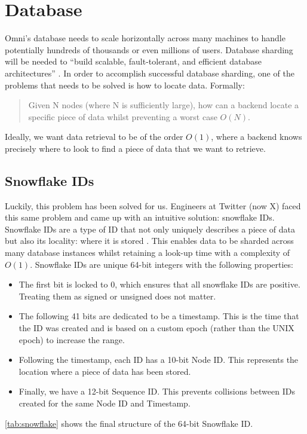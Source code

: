 \section{Database}
\label{sec:design-system-database}
Omni's database needs to scale horizontally across many machines to handle potentially hundreds of thousands or even millions of users. Database sharding will be needed to ``build scalable, fault-tolerant, and efficient database architectures'' \citep{shethiya2025load}.
In order to accomplish successful database sharding, one of the problems that needs to be solved is how to locate data. Formally:
\begin{quotation} %
Given N nodes (where N is sufficiently large), how can a backend locate a specific piece of data whilst preventing a worst case $O(N)$.
\end{quotation}
Ideally, we want data retrieval to be of the order $O(1)$, where a backend knows precisely where to look to find a piece of data that we want to retrieve.

\subsection{Snowflake IDs} 
\label{sec:design-system-database-snowflake}
Luckily, this problem has been solved for us. Engineers at Twitter (now X) faced this same problem and came up with an intuitive solution: snowflake IDs. Snowflake IDs are a type of ID that not only uniquely describes a piece of data but also its locality: where it is stored \citep{2010snowflake}. This enables data to be sharded across many database instances whilst retaining a look-up time with a complexity of $O(1)$.
Snowflake IDs are unique 64-bit integers with the following properties:
\begin{itemize}
    \item The first bit is locked to 0, which ensures that all snowflake IDs are positive. Treating them as signed or unsigned does not matter.
    \item The following 41 bits are dedicated to be a timestamp. This is the time that the ID was created and is based on a custom epoch (rather than the UNIX epoch) to increase the range.
    \item Following the timestamp, each ID has a 10-bit Node ID. This represents the location where a piece of data has been stored.
    \item Finally, we have a 12-bit Sequence ID. This prevents collisions between IDs created for the same Node ID and Timestamp.
\end{itemize}
\ref{tab:snowflake} shows the final structure of the 64-bit Snowflake ID.

